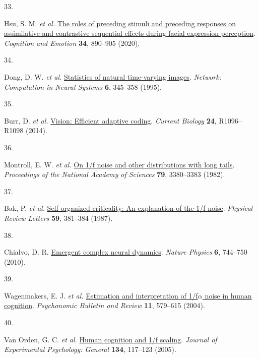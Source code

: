 \documentclass[
]{article}
\newlength{\cslhangindent}
\newlength{\csllabelwidth}
\newlength{\cslentryspacingunit} %
\newenvironment{CSLReferences}[2] %
 {%
  \setlength{\parindent}{0pt}
  \ifodd #1
  \let\oldpar\par
  \def\par{\hangindent=\cslhangindent\oldpar}
  \fi
  \setlength{\parskip}{#2\cslentryspacingunit}
 }%
 {}
\newcommand{\CSLLeftMargin}[1]{\parbox[t]{\csllabelwidth}{#1}}
\newcommand{\CSLRightInline}[1]{\parbox[t]{\linewidth - \csllabelwidth}{#1}\break}
\begin{document}
\begin{CSLReferences}{0}{0}
\leavevmode{}%
\CSLLeftMargin{33. }%
\CSLRightInline{Hsu, S. M. \emph{et al.}
\href{https://doi.org/10.1080/02699931.2019.1696752}{{The roles of
preceding stimuli and preceding responses on assimilative and
contrastive sequential effects during facial expression perception}}.
\emph{Cognition and Emotion} \textbf{34}, 890--905 (2020).}

\leavevmode{}%
\CSLLeftMargin{34. }%
\CSLRightInline{Dong, D. W. \emph{et al.}
\href{https://doi.org/10.1088/0954-898X_6_3_003}{{Statistics of natural
time-varying images}}. \emph{Network: Computation in Neural Systems}
\textbf{6}, 345--358 (1995).}

\leavevmode{}%
\CSLLeftMargin{35. }%
\CSLRightInline{Burr, D. \emph{et al.}
\href{https://doi.org/10.1016/j.cub.2014.10.002}{{Vision: Efficient
adaptive coding}}. \emph{Current Biology} \textbf{24}, R1096--R1098
(2014).}

\leavevmode{}%
\CSLLeftMargin{36. }%
\CSLRightInline{Montroll, E. W. \emph{et al.}
\href{https://doi.org/10.1073/pnas.79.10.3380}{{On 1/f noise and other
distributions with long tails}}. \emph{Proceedings of the National
Academy of Sciences} \textbf{79}, 3380--3383 (1982).}

\leavevmode{}%
\CSLLeftMargin{37. }%
\CSLRightInline{Bak, P. \emph{et al.}
\href{https://doi.org/10.1103/PhysRevLett.59.381}{{Self-organized
criticality: An explanation of the 1/f noise}}. \emph{Physical Review
Letters} \textbf{59}, 381--384 (1987).}

\leavevmode{}%
\CSLLeftMargin{38. }%
\CSLRightInline{Chialvo, D. R.
\href{https://doi.org/10.1038/nphys1803}{{Emergent complex neural
dynamics}}. \emph{Nature Physics} \textbf{6}, 744--750 (2010).}

\leavevmode{}%
\CSLLeftMargin{39. }%
\CSLRightInline{Wagenmakers, E. J. \emph{et al.}
\href{https://doi.org/10.3758/BF03196615}{{Estimation and interpretation
of 1/f\(\alpha\) noise in human cognition}}. \emph{Psychonomic Bulletin
and Review} \textbf{11}, 579--615 (2004).}

\leavevmode{}%
\CSLLeftMargin{40. }%
\CSLRightInline{Van Orden, G. C. \emph{et al.}
\href{https://doi.org/10.1037/0096-3445.134.1.117}{{Human cognition and
1/f scaling}}. \emph{Journal of Experimental Psychology: General}
\textbf{134}, 117--123 (2005).}


\end{CSLReferences}
\end{document}
